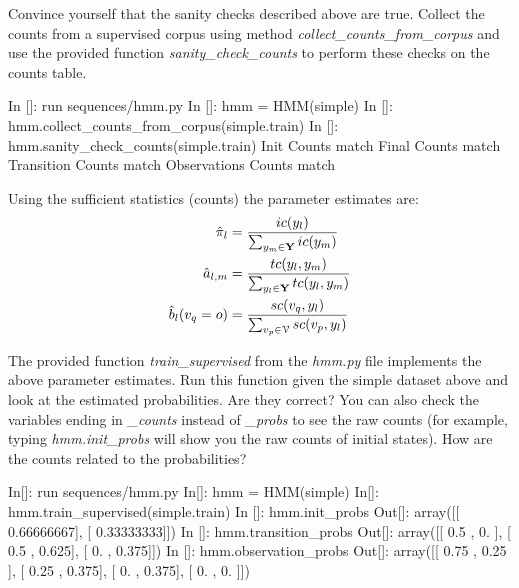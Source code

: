 \begin{exercise}
Convince yourself that the sanity checks described above are true. Collect the counts from a supervised corpus using method
\emph{collect\_counts\_from\_corpus} and use the provided function \emph{sanity\_check\_counts} to perform these checks on the counts table. 

\begin{python}
In []: run sequences/hmm.py
In []: hmm = HMM(simple)
In []: hmm.collect_counts_from_corpus(simple.train)
In []: hmm.sanity_check_counts(simple.train)
Init Counts match
Final Counts match
Transition Counts match
Observations Counts match
\end{python}
\end{exercise}


Using the sufficient statistics (counts) the parameter estimates are: 
\begin{align}
  \hat{\pi}_l &=  \frac{ic({y}_l)}{\sum_{{y}_m \in \mathbf{Y}}
    ic({y}_m)}\\
  \hat{a}_{l,m} &= \frac{tc({y}_l,{y}_m)}{\sum_{{y}_l \in \mathbf{Y}} tc({y}_l,{y}_m)} \\
  \hat{b}_l({v}_q = o) &= \frac{sc({v}_q,{y}_l)}{\sum_{{v}_p \in\mathcal{V}} sc({v}_p,{y}_l)}
\end{align}


\begin{exercise}
The provided function \emph{train\_supervised} from the \emph{hmm.py} file implements the above parameter estimates.
Run this function given the simple dataset above and look at the estimated probabilities. Are they correct? You can also check the variables ending in \emph{\_counts} instead of \emph{\_probs} to see the raw counts (for example, typing \emph{hmm.init\_probs} will show you the raw counts of initial states). How are the counts related to the probabilities?
\begin{python}
In[]:  run sequences/hmm.py
In[]: hmm = HMM(simple)
In[]: hmm.train_supervised(simple.train)
In []: hmm.init_probs
Out[]: 
array([[ 0.66666667],
       [ 0.33333333]])
In []: hmm.transition_probs
Out[]: 
array([[ 0.5  ,  0.   ],
       [ 0.5  ,  0.625],
       [ 0.   ,  0.375]])
In []: hmm.observation_probs
Out[]: 
array([[ 0.75 ,  0.25 ],
       [ 0.25 ,  0.375],
       [ 0.   ,  0.375],
       [ 0.   ,  0.   ]])
\end{python}
\end{exercise}



